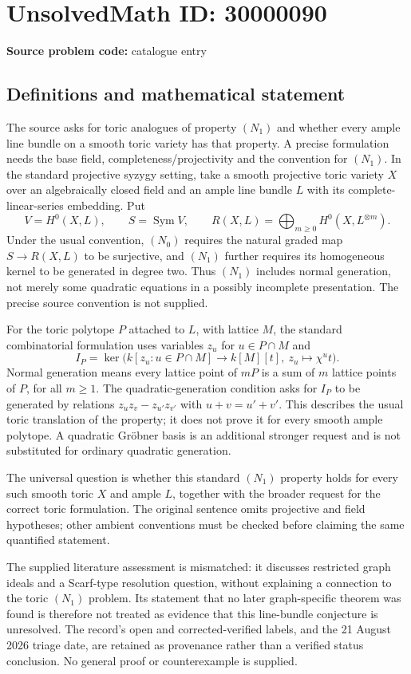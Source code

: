 \documentclass[11pt]{article}
\begin{document}
\section*{UnsolvedMath ID: 30000090}
\textbf{Source problem code:} catalogue entry
\subsection{Definitions and mathematical statement}
The source asks for toric analogues of property $(N_1)$ and whether every ample line bundle on a smooth toric variety has that property. A precise formulation needs the base field, completeness/projectivity and the convention for $(N_1)$. In the standard projective syzygy setting, take a smooth projective toric variety $X$ over an algebraically closed field and an ample line bundle $L$ with its complete-linear-series embedding. Put
\[
 V=H^0(X,L),\qquad S=\operatorname{Sym}V,\qquad
 R(X,L)=\bigoplus_{m\geq0}H^0(X,L^{\otimes m}).
\]
Under the usual convention, $(N_0)$ requires the natural graded map $S\to R(X,L)$ to be surjective, and $(N_1)$ further requires its homogeneous kernel to be generated in degree two. Thus $(N_1)$ includes normal generation, not merely some quadratic equations in a possibly incomplete presentation. The precise source convention is not supplied.

For the toric polytope $P$ attached to $L$, with lattice $M$, the standard combinatorial formulation uses variables $z_u$ for $u\in P\cap M$ and
\[
 I_P=\ker\bigl(k[z_u:u\in P\cap M]\to k[M][t],
                    \ z_u\mapsto\chi^u t\bigr).
\]
Normal generation means every lattice point of $mP$ is a sum of $m$ lattice points of $P$, for all $m\geq1$. The quadratic-generation condition asks for $I_P$ to be generated by relations $z_uz_v-z_{u'}z_{v'}$ with $u+v=u'+v'$. This describes the usual toric translation of the property; it does not prove it for every smooth ample polytope. A quadratic Gr\"obner basis is an additional stronger request and is not substituted for ordinary quadratic generation.

The universal question is whether this standard $(N_1)$ property holds for every such smooth toric $X$ and ample $L$, together with the broader request for the correct toric formulation. The original sentence omits projective and field hypotheses; other ambient conventions must be checked before claiming the same quantified statement.

The supplied literature assessment is mismatched: it discusses restricted graph ideals and a Scarf-type resolution question, without explaining a connection to the toric $(N_1)$ problem. Its statement that no later graph-specific theorem was found is therefore not treated as evidence that this line-bundle conjecture is unresolved. The record's open and corrected-verified labels, and the 21 August 2026 triage date, are retained as provenance rather than a verified status conclusion. No general proof or counterexample is supplied.
\end{document}
